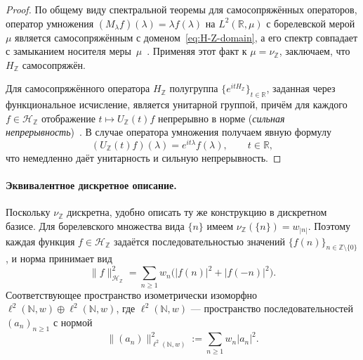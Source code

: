 \documentclass{article}
\numberwithin{equation}{section}
\theoremstyle{plain}
\theoremstyle{definition}
\theoremstyle{remark}
\begin{document}
\begin{proof}
По общему виду спектральной теоремы для самосопряжённых операторов,
оператор умножения \((M_\lambda f)(\lambda)=\lambda f(\lambda)\) на
\(L^2(\mathbb R,\mu)\) с борелевской мерой \(\mu\) является самосопряжённым
с доменом~\eqref{eq:H-Z-domain}, а его спектр совпадает с замыканием
носителя меры~\(\mu\)~\cite{ReedSimonI}. Применяя этот факт к
\(\mu=\nu_{\mathbb Z}\), заключаем, что \(H_{\mathbb Z}\) самосопряжён.

Для самосопряжённого оператора \(H_{\mathbb Z}\) полугруппа
\(\{e^{itH_{\mathbb Z}}\}_{t\in\mathbb R}\), заданная через функциональное
исчисление, является унитарной группой, причём для каждого \(f\in\mathcal H_{\mathbb Z}\)
отображение \(t\mapsto U_{\mathbb Z}(t)f\) непрерывно в норме
(\emph{сильная непрерывность})~\cite{Yosida1980}. В случае оператора умножения
получаем явную формулу
\begin{equation}
\label{eq:U-Z-explicit}
(U_{\mathbb Z}(t) f)(\lambda)
= e^{it\lambda} f(\lambda),
\qquad t\in\mathbb R,
\end{equation}
что немедленно даёт унитарность и сильную непрерывность.
\end{proof}

\paragraph{Эквивалентное дискретное описание.}
Поскольку \(\nu_{\mathbb Z}\) дискретна, удобно описать ту же конструкцию
в дискретном базисе. Для борелевского множества вида \(\{n\}\) имеем
\(\nu_{\mathbb Z}(\{n\})=w_{|n|}\). Поэтому каждая функция
\(f\in\mathcal H_{\mathbb Z}\) задаётся последовательностью значений
\(\{f(n)\}_{n\in\mathbb Z\setminus\{0\}}\), и норма принимает вид
\begin{equation}
\label{eq:H-Z-norm-discrete}
\|f\|_{\mathcal H_{\mathbb Z}}^2
=
\sum_{n\ge 1} w_n\big(|f(n)|^2+|f(-n)|^2\big).
\end{equation}
Соответствующее пространство изометрически изоморфно
\(\ell^2(\mathbb N,w)\oplus\ell^2(\mathbb N,w)\), где
\(\ell^2(\mathbb N,w)\) — пространство последовательностей
\((a_n)_{n\ge 1}\) с нормой
\begin{equation}
\label{eq:l2-weight}
\|(a_n)\|_{\ell^2(\mathbb N,w)}^2
:=
\sum_{n\ge 1} w_n|a_n|^2.
\end{equation}
\end{document}
